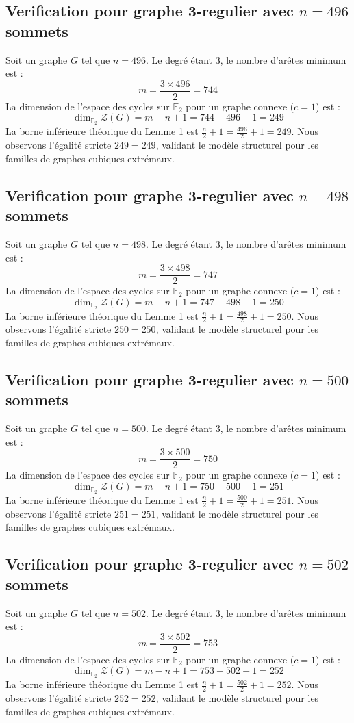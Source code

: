 \documentclass[11pt,a4paper]{article}
\begin{document}
\subsection{Verification pour graphe 3-regulier avec $n=496$ sommets}
Soit un graphe $G$ tel que $n = 496$. Le degré étant 3, le nombre d'arêtes minimum est :
$$ m = \frac{3 \times 496}{2} = 744 $$
La dimension de l'espace des cycles sur $\mathbb{F}_2$ pour un graphe connexe ($c=1$) est :
$$ \dim_{\mathbb{F}_2} \mathcal{Z}(G) = m - n + 1 = 744 - 496 + 1 = 249 $$
La borne inférieure théorique du Lemme 1 est $\frac{n}{2} + 1 = \frac{496}{2} + 1 = 249$.
Nous observons l'égalité stricte $249 = 249$, validant le modèle structurel pour les familles de graphes cubiques extrémaux.

\subsection{Verification pour graphe 3-regulier avec $n=498$ sommets}
Soit un graphe $G$ tel que $n = 498$. Le degré étant 3, le nombre d'arêtes minimum est :
$$ m = \frac{3 \times 498}{2} = 747 $$
La dimension de l'espace des cycles sur $\mathbb{F}_2$ pour un graphe connexe ($c=1$) est :
$$ \dim_{\mathbb{F}_2} \mathcal{Z}(G) = m - n + 1 = 747 - 498 + 1 = 250 $$
La borne inférieure théorique du Lemme 1 est $\frac{n}{2} + 1 = \frac{498}{2} + 1 = 250$.
Nous observons l'égalité stricte $250 = 250$, validant le modèle structurel pour les familles de graphes cubiques extrémaux.

\subsection{Verification pour graphe 3-regulier avec $n=500$ sommets}
Soit un graphe $G$ tel que $n = 500$. Le degré étant 3, le nombre d'arêtes minimum est :
$$ m = \frac{3 \times 500}{2} = 750 $$
La dimension de l'espace des cycles sur $\mathbb{F}_2$ pour un graphe connexe ($c=1$) est :
$$ \dim_{\mathbb{F}_2} \mathcal{Z}(G) = m - n + 1 = 750 - 500 + 1 = 251 $$
La borne inférieure théorique du Lemme 1 est $\frac{n}{2} + 1 = \frac{500}{2} + 1 = 251$.
Nous observons l'égalité stricte $251 = 251$, validant le modèle structurel pour les familles de graphes cubiques extrémaux.

\subsection{Verification pour graphe 3-regulier avec $n=502$ sommets}
Soit un graphe $G$ tel que $n = 502$. Le degré étant 3, le nombre d'arêtes minimum est :
$$ m = \frac{3 \times 502}{2} = 753 $$
La dimension de l'espace des cycles sur $\mathbb{F}_2$ pour un graphe connexe ($c=1$) est :
$$ \dim_{\mathbb{F}_2} \mathcal{Z}(G) = m - n + 1 = 753 - 502 + 1 = 252 $$
La borne inférieure théorique du Lemme 1 est $\frac{n}{2} + 1 = \frac{502}{2} + 1 = 252$.
Nous observons l'égalité stricte $252 = 252$, validant le modèle structurel pour les familles de graphes cubiques extrémaux.
\end{document}
